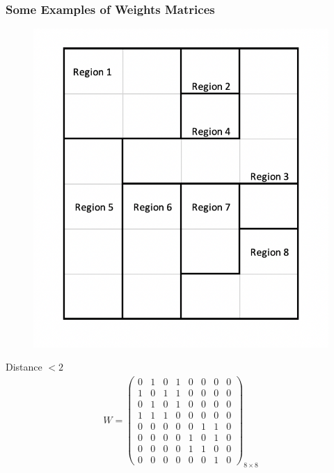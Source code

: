 \documentclass[
  shownotes,
  xcolor={svgnames},
  hyperref={colorlinks,citecolor=DarkBlue,linkcolor=DarkRed,urlcolor=DarkBlue}
  ]{beamer}
\begin{document}
\begin{frame}[fragile]
\frametitle{Some Examples of Weights Matrices}


\begin{minipage}[t]{0.53\linewidth}
  \begin{figure}[H] \centering
    \captionsetup{justification=centering}
    \includegraphics[scale=0.6]{figures/regions_example}
   \end{figure}
  
    \end{minipage}
    \hfill
\begin{minipage}[t]{0.43\linewidth}%
\scriptsize
Distance $<2$
\begin{align}
W=\left(\begin{array}{cccccccc}
0 & 1 & 0 & 1 & 0 & 0 & 0 & 0\\
1 & 0 & 1 & 1 & 0 & 0 & 0 & 0\\
0 & 1 & 0 & 1 & 0 & 0 & 0 & 0\\
1 & 1 & 1 & 0 & 0 & 0 & 0 & 0\\
0 & 0 & 0 & 0 & 0 & 1 & 1 & 0\\
0 & 0 & 0 & 0 & 1 & 0 & 1 & 0\\
0 & 0 & 0 & 0 & 1 & 1 & 0 & 0\\
0 & 0 & 0 & 0 & 0 & 0 & 1 & 0
\end{array}\right)_{8\times8} \nonumber
\end{align}
\end{minipage}

\end{frame}
\end{document}
